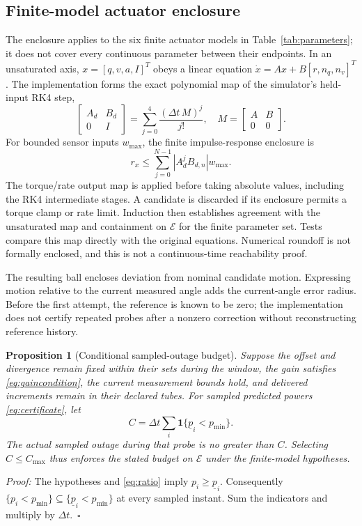 \documentclass[10pt,journal]{IEEEtran}
\newtheorem{proposition}{Proposition}
\begin{document}
\subsection{Finite-model actuator enclosure}
The enclosure applies to the six finite actuator models in Table~\ref{tab:parameters}; it does not cover every continuous parameter between their endpoints. In an unsaturated axis, $x=[q,v,a,I]^T$ obeys a linear equation $\dot x=Ax+B[r,n_q,n_v]^T$. The implementation forms the exact polynomial map of the simulator's held-input RK4 step,
\begin{equation}
 \begin{bmatrix}A_d&B_d\\0&I\end{bmatrix}
 =\sum_{j=0}^4\frac{(\Delta t\,M)^j}{j!},\quad
 M=\begin{bmatrix}A&B\\0&0\end{bmatrix}.
\end{equation}
For bounded sensor inputs $w_{\max}$, the finite impulse-response enclosure is
\begin{equation}
 r_x\leq\sum_{j=0}^{N-1}|A_d^jB_{d,n}|w_{\max}.
\end{equation}
The torque/rate output map is applied before taking absolute values, including the RK4 intermediate stages. A candidate is discarded if its enclosure permits a torque clamp or rate limit. Induction then establishes agreement with the unsaturated map and containment on $\mathcal E$ for the finite parameter set. Tests compare this map directly with the original equations. Numerical roundoff is not formally enclosed, and this is not a continuous-time reachability proof.

The resulting ball encloses deviation from nominal candidate motion. Expressing motion relative to the current measured angle adds the current-angle error radius. Before the first attempt, the reference is known to be zero; the implementation does not certify repeated probes after a nonzero correction without reconstructing reference history.

\begin{proposition}[Conditional sampled-outage budget]
Suppose the offset and divergence remain fixed within their sets during the window, the gain satisfies \eqref{eq:gaincondition}, the current measurement bounds hold, and delivered increments remain in their declared tubes. For sampled predicted powers \eqref{eq:certificate}, let
\begin{equation}
 C=\Delta t\sum_i\mathbf1\{\underline p_i<p_{\min}\}.
\end{equation}
The actual sampled outage during that probe is no greater than $C$. Selecting $C\leq C_{\max}$ thus enforces the stated budget on $\mathcal E$ under the finite-model hypotheses.
\end{proposition}
\emph{Proof:} The hypotheses and \eqref{eq:ratio} imply $p_i\geq\underline p_i$. Consequently $\{p_i<p_{\min}\}\subseteq\{\underline p_i<p_{\min}\}$ at every sampled instant. Sum the indicators and multiply by $\Delta t$.~$\square$
\end{document}
